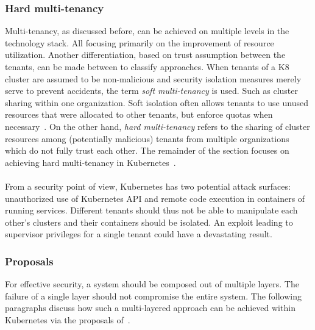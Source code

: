 \subsubsection{Hard multi-tenancy}
Multi-tenancy, as discussed before, can be achieved on multiple levels in the technology stack. All focusing primarily on the improvement of resource utilization. Another differentiation, based on trust assumption between the tenants, can be made between to classify approaches. When tenants of a K8 cluster are assumed to be non-malicious and security isolation measures merely serve to prevent accidents, the term \textit{soft multi-tenancy} is used. Such as cluster sharing within one organization. Soft isolation often allows tenants to use unused resources that were allocated to other tenants, but enforce quotas when necessary~\cite{mozafari2013dbseer}. On the other hand, \textit{hard multi-tenancy} refers to the sharing of cluster resources among (potentially malicious) tenants from multiple organizations which do not fully trust each other. The remainder of the section focuses on achieving hard multi-tenancy in Kubernetes~\cite{hardmulti}.
\\\\
From a security point of view, Kubernetes has two potential attack surfaces:  unauthorized use of Kubernetes API and remote code execution in containers of running services. Different tenants should thus not be able to manipulate each other's clusters and their containers should be isolated. An exploit leading to supervisor privileges for a single tenant could have a devastating result.~\cite{hardmultiproposals} 

\subsubsection{Proposals}
For effective security, a system should be composed out of multiple layers. The failure of a single layer should not compromise the entire system. The following paragraphs discuss how such a multi-layered approach can be achieved within Kubernetes via the proposals of~\cite{hardmultiproposals}.

